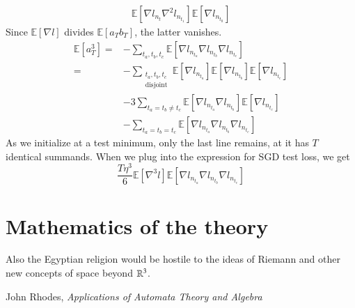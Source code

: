 \documentclass[openany, notitlepage, justified]{tufte-book}
\theoremstyle{plain}
\theoremstyle{definition}
\newcommand{\expct}[1]{\mathbb{E}\left[#1\right]}
\begin{document}
\begin{shaded}
\begin{align*}
                                \expct{\nabla l_{n_t} \nabla^2 l_{n_{t_1}}} \expct{\nabla l_{n_{t_0}}}
                \end{align*}
                Since $\expct{\nabla l}$ divides $\expct{a_T b_T}$, the latter
                vanishes.
                \begin{align*}
                    \expct{a_T^3}
                        =&- \sum_{t_a, t_b, t_c}
                                \expct{\nabla l_{n_{t_a}} \nabla l_{n_{t_b}} \nabla l_{n_{t_c}}}
                        \\
                        =&- \sum_{\substack{t_a, t_b, t_c\\ \text{disjoint}}}  
                                \expct{\nabla l_{n_{t_a}}} \expct{\nabla l_{n_{t_b}}} \expct{\nabla l_{n_{t_c}}}
                        \\&-3 \sum_{t_a=t_b\neq t_c}  
                                \expct{\nabla l_{n_{t_a}} \nabla l_{n_{t_b}}} \expct{\nabla l_{n_{t_c}}}
                        \\&-\sum_{t_a=t_b=t_c}  
                                \expct{\nabla l_{n_{t_a}} \nabla l_{n_{t_b}} \nabla l_{n_{t_c}}}
                \end{align*}
                As we initialize at a test minimum, only the last line remains, at
                it has $T$ identical summands.
                When we plug into the expression for SGD test loss, we get
                $$
                    \frac{T \eta^3 }{6}
                    \expct{\nabla^3 l}
                    \expct{\nabla l_{n_{t_a}} \nabla l_{n_{t_b}} \nabla l_{n_{t_c}}}
                $$
            \end{shaded}




\chapter{Mathematics of the theory}\label{appendix:math}

    \renewcommand{\textflush}{flushright}
    \setlength{\epigraphwidth}{0.65\columnwidth}
    \epigraph{
        Also the Egyptian religion would be hostile to the ideas of Riemann
        and other new concepts of space beyond $\mathbb{R}^3$.
    }{John Rhodes, \emph{Applications of Automata Theory and Algebra}}
\end{document}
